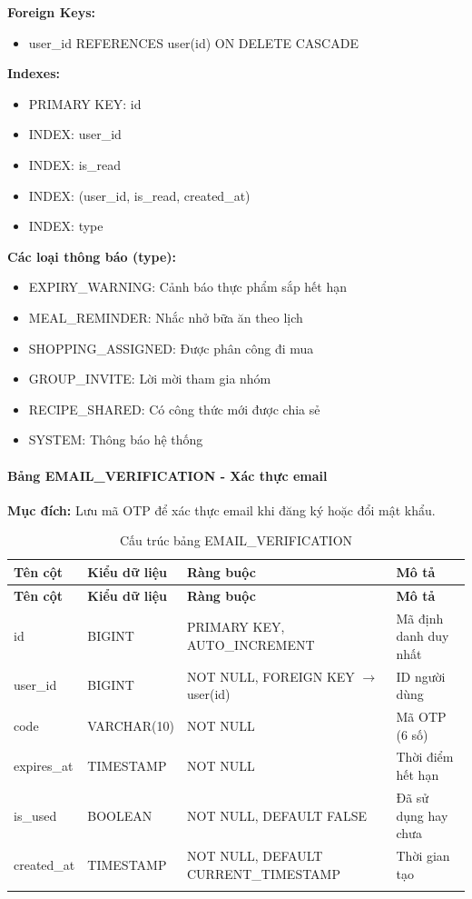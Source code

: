 \textbf{Foreign Keys:}
\begin{itemize}
    \item user\_id REFERENCES user(id) ON DELETE CASCADE
\end{itemize}

\textbf{Indexes:}
\begin{itemize}
    \item PRIMARY KEY: id
    \item INDEX: user\_id
    \item INDEX: is\_read
    \item INDEX: (user\_id, is\_read, created\_at)
    \item INDEX: type
\end{itemize}

\textbf{Các loại thông báo (type):}
\begin{itemize}
    \item EXPIRY\_WARNING: Cảnh báo thực phẩm sắp hết hạn
    \item MEAL\_REMINDER: Nhắc nhở bữa ăn theo lịch
    \item SHOPPING\_ASSIGNED: Được phân công đi mua
    \item GROUP\_INVITE: Lời mời tham gia nhóm
    \item RECIPE\_SHARED: Có công thức mới được chia sẻ
    \item SYSTEM: Thông báo hệ thống
\end{itemize}

\paragraph{Bảng EMAIL\_VERIFICATION - Xác thực email}
\textbf{Mục đích:} Lưu mã OTP để xác thực email khi đăng ký hoặc đổi mật khẩu.

\small
\begin{longtable}{|>{\raggedright\arraybackslash}p{3.5cm}|>{\raggedright\arraybackslash}p{3cm}|>{\raggedright\arraybackslash}p{4cm}|>{\raggedright\arraybackslash}p{4cm}|}
\hline
\textbf{Tên cột} & \textbf{Kiểu dữ liệu} & \textbf{Ràng buộc} & \textbf{Mô tả} \\
\hline
\endfirsthead
\hline
\textbf{Tên cột} & \textbf{Kiểu dữ liệu} & \textbf{Ràng buộc} & \textbf{Mô tả} \\
\hline
\endhead
id & BIGINT & PRIMARY KEY, AUTO\_INCREMENT & Mã định danh duy nhất \\
\hline
user\_id & BIGINT & NOT NULL, FOREIGN KEY $\rightarrow$ user(id) & ID người dùng \\
\hline
code & VARCHAR(10) & NOT NULL & Mã OTP (6 số) \\
\hline
expires\_at & TIMESTAMP & NOT NULL & Thời điểm hết hạn \\
\hline
is\_used & BOOLEAN & NOT NULL, DEFAULT FALSE & Đã sử dụng hay chưa \\
\hline
created\_at & TIMESTAMP & NOT NULL, DEFAULT CURRENT\_TIMESTAMP & Thời gian tạo \\
\hline
\caption{Cấu trúc bảng EMAIL\_VERIFICATION}
\end{longtable}

